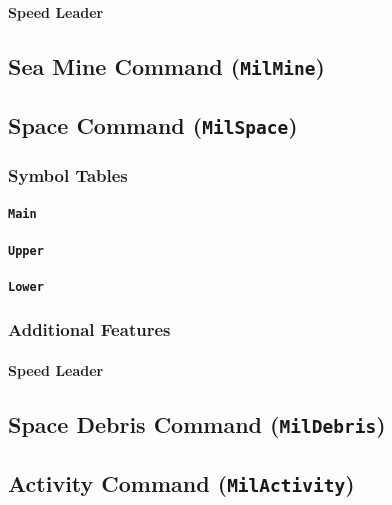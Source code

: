 \documentclass[a4paper, titlepage]{article}
\begin{document}
\paragraph{Speed Leader}

\subsection{Sea Mine Command (\textbf{\texttt{MilMine}})}

\subsection{Space Command (\textbf{\texttt{MilSpace}})}

\subsubsection{Symbol Tables}

\paragraph{\texttt{Main}}

\paragraph{\texttt{Upper}}

\paragraph{\texttt{Lower}}

\subsubsection{Additional Features}

\paragraph{Speed Leader}

\subsection{Space Debris Command (\textbf{\texttt{MilDebris}})}

\subsection{Activity Command (\textbf{\texttt{MilActivity}})}
\end{document}
